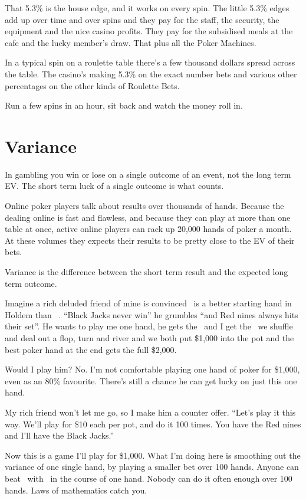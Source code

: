 That 5.3\% is the house edge, and it works on every spin. The little 5.3\%
edges add up over time and over spins and they pay for the staff, the
security, the equipment and the nice casino profits. They pay for the
subsidised meals at the cafe and the lucky member's draw. That plus
all the Poker Machines.

In a typical spin on a roulette table there's a few thousand dollars
spread across the table. The casino's making 5.3\% on the exact number
bets and various other percentages on the other kinds of Roulette Bets.

Run a few spins in an hour, sit back and watch the money roll in.

\section{Variance}

In gambling you win or lose on a single outcome of an event,
not the long term EV. The short term luck of a single outcome
is what counts.

Online poker players talk about results over thousands of hands. Because the
dealing online is fast and flawless, and because they can play at
more than one table at once, active online players can rack up
20,000 hands of poker a month. At these volumes they expects their
results to be pretty close to the EV of their bets.

Variance is the difference between the short term result and the
expected long term outcome.

Imagine a rich deluded friend of mine is convinced \nineh\nined\ is a better
starting hand in Holdem than \Jc\Js\ . ``Black Jacks never win'' he grumbles
``and Red nines always hits their set''. He wants to play me one hand, he
gets the \nineh\nined\ and I get the \Jc\Js\, we shuffle and deal out a flop,
turn and river and we both put \$1,000 into the pot and the best
poker hand at the end gets the full \$2,000.

Would I play him? No. I'm not comfortable playing one hand of poker
for \$1,000, even as an 80\% favourite. There's still a chance he can get
lucky on just this one hand.

My rich friend won't let me go, so I make him a counter offer.
``Let's play it this way. We'll play for \$10 each per pot, and do
it 100 times. You have the Red nines and I'll have the Black Jacks.''

Now this is a game I'll play for \$1,000. What I'm doing here is smoothing
out the variance of one single hand, by playing a smaller bet over
100 hands. Anyone can beat \Jc\Js\ with \nineh\nined\ in the course of one
hand. Nobody can do it often enough over 100 hands. Laws of mathematics
catch you.

